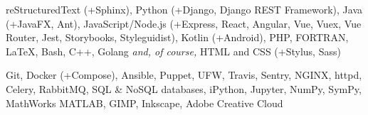 
\sectiondescription
{
reStructuredText (+Sphinx),
Python (+Django, Django REST Framework),
Java (+JavaFX, Ant),
JavaScript/Node.js (+Express, React, Angular, Vue, Vuex, Vue Router, Jest, Storybooks, Styleguidist),
Kotlin (+Android),
PHP, FORTRAN,
{\selectfont\LaTeX},
Bash, C++, Golang
\textit{and, of course,} HTML and CSS (+Stylus, Sass)
}

\sectiondescription
{
Git,
Docker (+Compose),
Ansible, Puppet, UFW,
Travis, Sentry,
NGINX, httpd, Celery, RabbitMQ, SQL \& NoSQL databases,
iPython, Jupyter, NumPy, SymPy, MathWorks MATLAB,
GIMP, Inkscape, Adobe Creative Cloud
}
